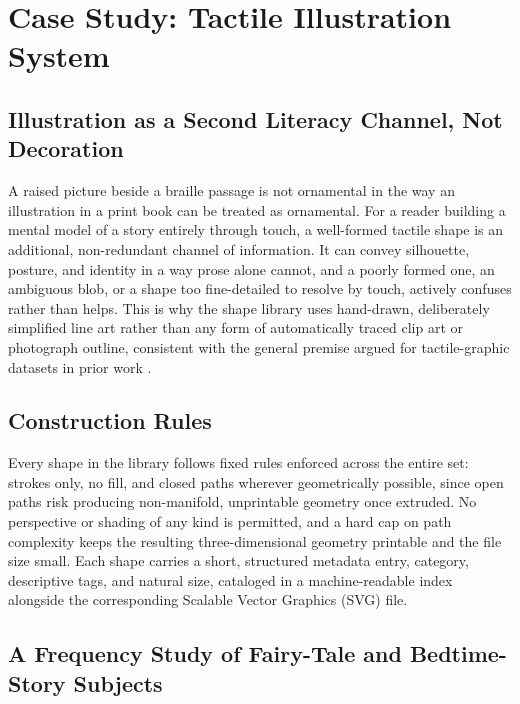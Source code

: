 \documentclass[conference]{IEEEtran}
\begin{document}
\section{Case Study: Tactile Illustration System}\label{sec:illustration}

\subsection{Illustration as a Second Literacy Channel, Not Decoration}

A raised picture beside a braille passage is not ornamental in the way an illustration in a print book can be treated as ornamental. For a reader building a mental model of a story entirely through touch, a well-formed tactile shape is an additional, non-redundant channel of information. It can convey silhouette, posture, and identity in a way prose alone cannot, and a poorly formed one, an ambiguous blob, or a shape too fine-detailed to resolve by touch, actively confuses rather than helps. This is why the shape library uses hand-drawn, deliberately simplified line art rather than any form of automatically traced clip art or photograph outline, consistent with the general premise argued for tactile-graphic datasets in prior work \cite{tactilenet}.

\subsection{Construction Rules}

Every shape in the library follows fixed rules enforced across the entire set: strokes only, no fill, and closed paths wherever geometrically possible, since open paths risk producing non-manifold, unprintable geometry once extruded. No perspective or shading of any kind is permitted, and a hard cap on path complexity keeps the resulting three-dimensional geometry printable and the file size small. Each shape carries a short, structured metadata entry, category, descriptive tags, and natural size, cataloged in a machine-readable index alongside the corresponding Scalable Vector Graphics (SVG) file.

\subsection{A Frequency Study of Fairy-Tale and Bedtime-Story Subjects}
\end{document}
